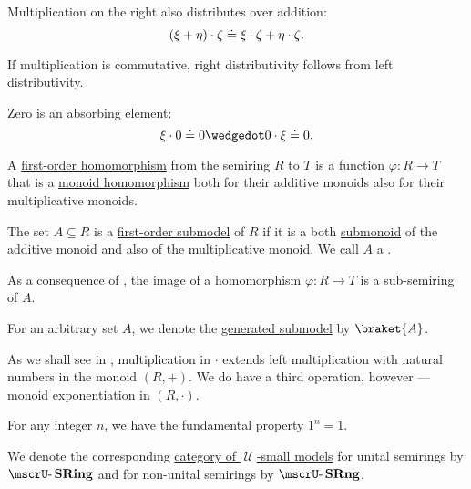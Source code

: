 \begin{definition}
\begin{thmenum}
\begin{thmenum}
       Multiplication on the right also distributes over addition:
      \begin{equation}\label{eq:def:semiring/right_distributivity}
        (\xi + \eta) \cdot \zeta \doteq \xi \cdot \zeta + \eta \cdot \zeta.
      \end{equation}

      If multiplication is commutative, right distributivity follows from left distributivity.

       Zero is an absorbing element:
      \begin{equation}\label{eq:def:semiring/absorption}
        \xi \cdot 0 \syneq 0 \synwedge 0 \cdot \xi \syneq 0.
      \end{equation}
    \end{thmenum}

     A \hyperref[def:first_order_homomorphism]{first-order homomorphism} from the semiring \( R \) to \( T \) is a function \( \varphi: R \to T \) that is a \hyperref[def:monoid/homomorphism]{monoid homomorphism} both for their additive monoids also for their multiplicative monoids.

     The set \( A \subseteq R \) is a \hyperref[def:first_order_submodel]{first-order submodel} of \( R \) if it is a both \hyperref[def:monoid/submodel]{submonoid} of the additive monoid and also of the multiplicative monoid. We call \( A \) a .

    As a consequence of , the \hyperref[def:set_valued_map/image]{image} of a homomorphism \( \varphi: R \to T \) is a sub-semiring of \( A \).

     For an arbitrary set \( A \), we denote the \hyperref[def:first_order_generated_substructure]{generated submodel} by \( \braket{ A } \).

     As we shall see in , multiplication in \( \cdot \) extends left multiplication with natural numbers in the monoid \( (R, +) \). We do have a third operation, however --- \hyperref[def:monoid/exponentiation]{monoid exponentiation} in \( (R, \cdot) \).

    For any integer \( n \), we have the fundamental property \( 1^n = 1 \).

     We denote the corresponding \hyperref[def:category_of_small_first_order_models]{category of \( \mscrU \)-small models} for unital semirings by \( \ucat{SRing} \) and for non-unital semirings by \( \ucat{SRng} \).


\end{thmenum}
\end{definition}

